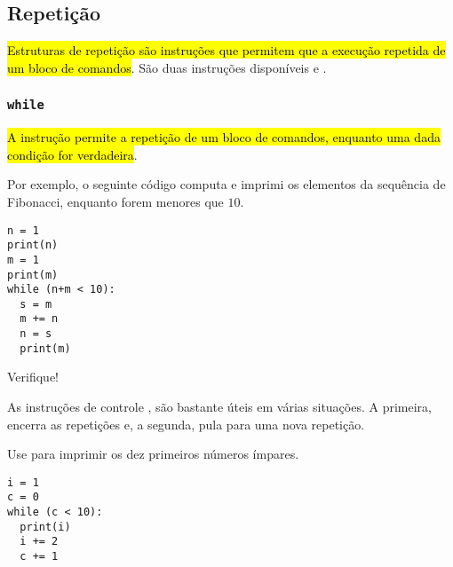 \subsection{Repetição}

\hl{Estruturas de repetição são instruções que permitem que a execução repetida de um bloco de comandos}. São duas instruções disponíveis {\PYTHONwhile} e {\PYTHONfor}.

\subsubsection{\texttt{while}}

\hl{A instrução {\PYTHONwhile} permite a repetição de um bloco de comandos, enquanto uma dada condição for verdadeira}. 

Por exemplo, o seguinte código computa e imprimi os elementos da sequência de Fibonacci{\fibonacci}, enquanto forem menores que $10$.

\begin{lstlisting}
n = 1
print(n)
m = 1
print(m)
while (n+m < 10):
  s = m
  m += n
  n = s
  print(m)
\end{lstlisting}

Verifique!

\begin{obs}
  As instruções de controle {\PYTHONbreak}, {\PYTHONcontinue} são bastante úteis em várias situações. A primeira, encerra as repetições e, a segunda, pula para uma nova repetição.
\end{obs}

\begin{exer}
  Use {\PYTHONwhile} para imprimir os dez primeiros números ímpares.
\end{exer}
\begin{resp}
  
\begin{lstlisting}
i = 1
c = 0
while (c < 10):
  print(i)
  i += 2
  c += 1
\end{lstlisting}

\end{resp}

